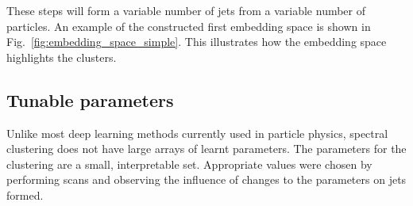     These steps will form a variable number of jets from a variable number of particles.
    An example of the constructed first embedding space is shown in Fig.~\ref{fig:embedding_space_simple}.
    This illustrates how the embedding space highlights the clusters.

\subsection{Tunable parameters}\label{sec:spectralmethodparam}
Unlike most deep learning methods currently used in particle physics, spectral clustering does not have large arrays of learnt parameters.
The parameters for the clustering are a small, interpretable set.
Appropriate values were chosen by performing scans and observing the influence of changes to the parameters on jets formed.

